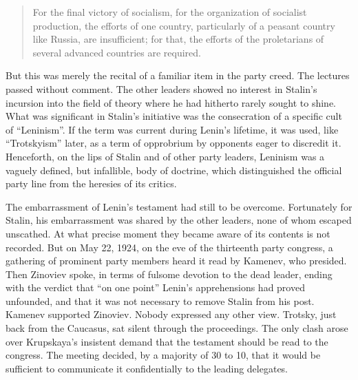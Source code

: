 \begin{quote}
For the final victory of socialism, for the organization of socialist production, the efforts of one country, particularly of a peasant country like Russia, are insufficient; for that, the efforts of the proletarians of several advanced countries are required. 
\end{quote}

But this was merely the recital of a familiar item in the party creed. The lectures passed without comment. The other leaders showed no interest in Stalin's incursion into the field of theory where he had hitherto rarely sought to shine. What was significant in Stalin's initiative was the consecration of a specific cult of ``Leninism''. If the term was current during Lenin's lifetime, it was used, like ``Trotskyism'' later, as a term of opprobrium by opponents eager to discredit it. Henceforth, on the lips of Stalin and of other party leaders, Leninism was a vaguely defined, but infallible, body of doctrine, which distinguished the official party line from the heresies of its critics. 

The embarrassment of Lenin's testament had still to be overcome. Fortunately for Stalin, his embarrassment was shared by the other leaders, none of whom escaped unscathed. At what precise moment they became aware of its contents is not recorded. But on May 22, 1924, on the eve of the thirteenth party congress, a gathering of prominent party members heard it read by Kamenev, who presided. Then Zinoviev spoke, in terms of fulsome devotion to the dead leader, ending with the verdict that ``on one point'' Lenin's apprehensions had proved unfounded, and that it was not necessary to remove Stalin from his post. Kamenev supported Zinoviev. Nobody expressed any other view. Trotsky, just back from the Caucasus, sat silent through the proceedings. The only clash arose over Krupskaya's insistent demand that the testament should be read to the congress. The meeting decided, by a majority of 30 to 10, that it would be sufficient to communicate it confidentially to the leading delegates. 

